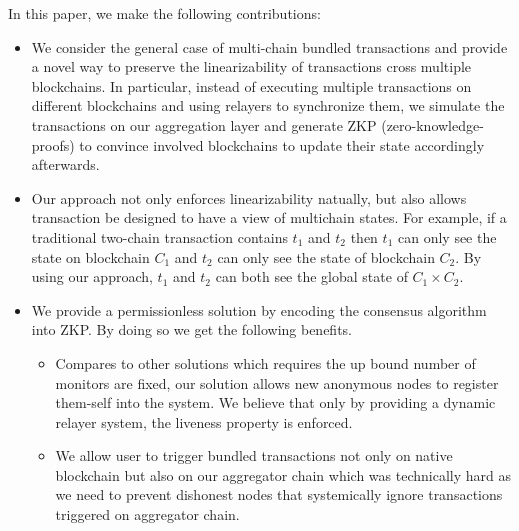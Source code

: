 In this paper, we make the following contributions:
\begin{itemize}
\item We consider the general case of multi-chain bundled transactions and provide a novel way to preserve the linearizability of transactions cross multiple blockchains. In particular, instead of executing multiple transactions on different blockchains and using relayers to synchronize them, we simulate the transactions on our aggregation layer and generate ZKP (zero-knowledge-proofs) to convince involved blockchains to update their state accordingly afterwards. \\

\item Our approach not only enforces linearizability natually, but also allows transaction be designed to have a view of multichain states. For example, if a traditional two-chain transaction contains $t_1$ and $t_2$ then $t_1$ can only see the state on blockchain $C_1$ and $t_2$ can only see the state of blockchain $C_2$. By using our approach, $t_1$ and $t_2$ can both see the global state of $C_1 \times C_2$.\\

\item We provide a permissionless solution by encoding the consensus algorithm into ZKP. By doing so we get the following benefits.
\begin{itemize}
    \item Compares to other solutions which requires the up bound number of monitors are fixed, our solution allows new anonymous nodes to register them-self into the system. We believe that only by providing a dynamic relayer system, the liveness property is enforced.
    \item We allow user to trigger bundled transactions not only on native blockchain but also on our aggregator chain which was technically hard as we need to prevent dishonest nodes that systemically ignore transactions triggered on aggregator chain.
    \end{itemize}
\end{itemize}